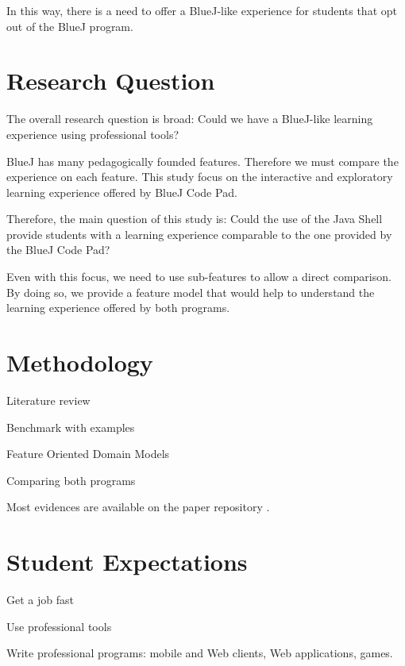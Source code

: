 \documentclass{article}
\begin{document}
In this way, there is a need to offer a BlueJ-like experience for students that opt out of the BlueJ program. 

\section{Research Question}

The overall research question is broad: Could we have a BlueJ-like learning experience using professional tools?

BlueJ has many pedagogically founded features. Therefore we must compare the experience on each feature. This study focus on the interactive and exploratory learning experience offered by BlueJ Code Pad.

Therefore, the main question of this study is:
Could the use of the Java Shell provide students with a learning experience comparable to the one provided by the BlueJ Code Pad?

Even with this focus, we need to use sub-features to allow a direct comparison. By doing so, we provide a feature model that would help to understand the learning experience offered by both programs.




\section{Methodology}

Literature review


Benchmark with examples

Feature Oriented Domain Models

Comparing both programs


Most evidences are available on the paper repository \cite{mangan2025codepadjshell}.

\section{Student Expectations}

Get a job fast

Use professional tools

Write professional programs: mobile and Web clients, Web applications, games.
\end{document}
